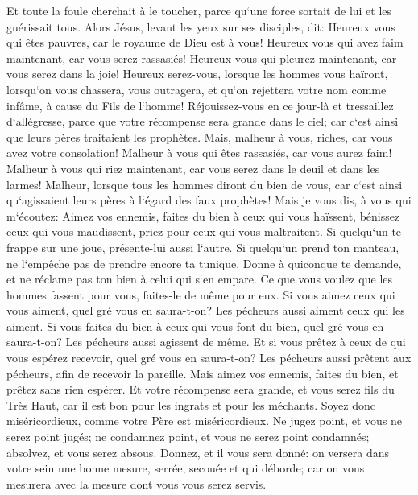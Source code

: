 \verse Et toute la foule cherchait à le toucher, parce qu`une force sortait de lui et les guérissait tous. 
\verse Alors Jésus, levant les yeux sur ses disciples, dit: Heureux vous qui êtes pauvres, car le royaume de Dieu est à vous! 
\verse Heureux vous qui avez faim maintenant, car vous serez rassasiés! Heureux vous qui pleurez maintenant, car vous serez dans la joie! 
\verse Heureux serez-vous, lorsque les hommes vous haïront, lorsqu`on vous chassera, vous outragera, et qu`on rejettera votre nom comme infâme, à cause du Fils de l`homme! 
\verse Réjouissez-vous en ce jour-là et tressaillez d`allégresse, parce que votre récompense sera grande dans le ciel; car c`est ainsi que leurs pères traitaient les prophètes. 
\verse Mais, malheur à vous, riches, car vous avez votre consolation! 
\verse Malheur à vous qui êtes rassasiés, car vous aurez faim! Malheur à vous qui riez maintenant, car vous serez dans le deuil et dans les larmes! 
\verse Malheur, lorsque tous les hommes diront du bien de vous, car c`est ainsi qu`agissaient leurs pères à l`égard des faux prophètes! 
\verse Mais je vous dis, à vous qui m`écoutez: Aimez vos ennemis, faites du bien à ceux qui vous haïssent, 
\verse bénissez ceux qui vous maudissent, priez pour ceux qui vous maltraitent. 
\verse Si quelqu`un te frappe sur une joue, présente-lui aussi l`autre. Si quelqu`un prend ton manteau, ne l`empêche pas de prendre encore ta tunique. 
\verse Donne à quiconque te demande, et ne réclame pas ton bien à celui qui s`en empare. 
\verse Ce que vous voulez que les hommes fassent pour vous, faites-le de même pour eux. 
\verse Si vous aimez ceux qui vous aiment, quel gré vous en saura-t-on? Les pécheurs aussi aiment ceux qui les aiment. 
\verse Si vous faites du bien à ceux qui vous font du bien, quel gré vous en saura-t-on? Les pécheurs aussi agissent de même. 
\verse Et si vous prêtez à ceux de qui vous espérez recevoir, quel gré vous en saura-t-on? Les pécheurs aussi prêtent aux pécheurs, afin de recevoir la pareille. 
\verse Mais aimez vos ennemis, faites du bien, et prêtez sans rien espérer. Et votre récompense sera grande, et vous serez fils du Très Haut, car il est bon pour les ingrats et pour les méchants. 
\verse Soyez donc miséricordieux, comme votre Père est miséricordieux. 
\verse Ne jugez point, et vous ne serez point jugés; ne condamnez point, et vous ne serez point condamnés; absolvez, et vous serez absous. 
\verse Donnez, et il vous sera donné: on versera dans votre sein une bonne mesure, serrée, secouée et qui déborde; car on vous mesurera avec la mesure dont vous vous serez servis. 
